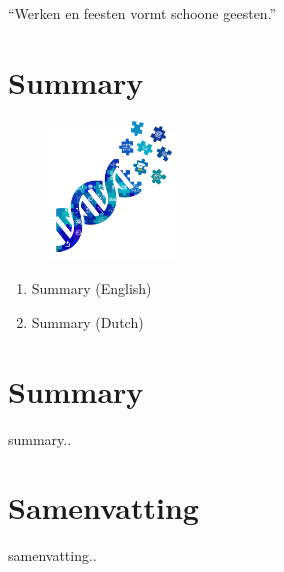\begin{savequote}[75mm]
``Werken en feesten vormt schoone geesten.''
\end{savequote}

\chapter{Summary}\label{chapter:summary}
\setcounter{figure}{-1}
\setcounter{table}{-1}
\setcounter{section}{-1}
\setcounter{NAT@ctr}{-1}

\begin{figure}[t!]
\includegraphics[height=10em]{frontmatter/images/samenvatting.png}
\end{figure}

\begin{enumerate}[label=\ref{chapter:summary}.\arabic*]
\itemsep-0.5em
\item Summary (English)
\item Summary (Dutch)
\end{enumerate}


\chapter*{Summary}

summary..

\chapter*{Samenvatting}

samenvatting..
